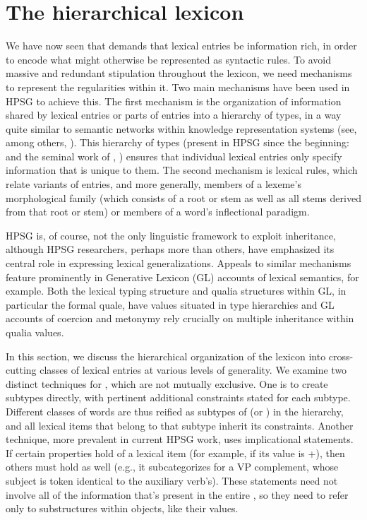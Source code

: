 \documentclass[output=paper,biblatex,babelshorthands,newtxmath,draftmode,colorlinks,citecolor=brown]{langscibook}
\begin{document}
\section{The hierarchical lexicon}
\label{sec:hier-lex}


We have now seen that 
demands that lexical entries be information rich, in order to encode what might otherwise be
represented as syntactic rules.  To avoid massive and redundant stipulation throughout the lexicon,
we need mechanisms to represent the regularities within it. Two main mechanisms have been used in
HPSG to achieve this. The first mechanism is the organization of information shared by lexical
entries or parts of entries into a hierarchy of types, in a way quite similar to semantic networks
within knowledge representation systems (see, among others, \citealt{BrachmanandSchmolze1985}). This
hierarchy of types (present in HPSG since the beginning: \citealt{PollardandSag1987} and the seminal
work of \citealt{Flickingeretal1985}, \citealt{Flickinger1987}) ensures that individual lexical
entries only specify information that is unique to them. The second mechanism is lexical rules,
which relate variants of entries, and more generally, members of a lexeme's morphological family
(which consists of a root or stem as well as all stems derived from that root or stem) or members of
a word's inflectional paradigm.

HPSG is, of course, not the only linguistic framework to exploit inheritance, although HPSG
researchers, perhaps more than others, have emphasized its central role in expressing lexical
generalizations. Appeals to similar mechanisms feature prominently in Generative Lexicon (GL)
accounts of lexical semantics, for example.  Both the lexical typing structure and qualia structures
within GL, in particular the formal quale, have values situated in type hierarchies
\citep{PustejovskyandJezek1996} and GL accounts of coercion and metonymy rely crucially on multiple
inheritance within qualia values.

In this section, we discuss the hierarchical organization of the lexicon into cross-cutting classes
of lexical entries at various levels of generality.  We examine two distinct techniques for
, which are not mutually exclusive.  One is to create subtypes directly, with
pertinent additional constraints stated for each subtype.  Different classes of words are thus
reified as subtypes of  (or ) in the hierarchy, and all lexical items
that belong to that subtype inherit its constraints.  Another technique, more prevalent in current
HPSG work, uses implicational statements.  If certain properties hold of a lexical item (for
example, if its  value is +), then others must hold as well (e.g., it subcategorizes for
a VP complement, whose subject is token identical to the auxiliary verb's).  These statements need
not involve all of the information that's present in the entire , so they need to refer
only to substructures within  objects, like their  values.
\end{document}
